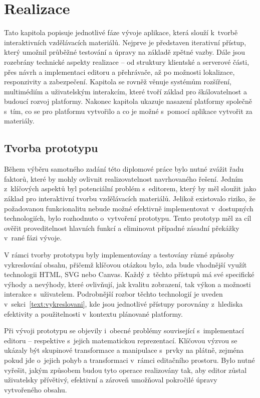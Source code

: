 \chapter{Realizace}

\begin{chapterabstract}
Tato kapitola popisuje jednotlivé fáze vývoje aplikace, která slouží k~tvorbě interaktivních vzdělávacích materiálů. 
Nejprve je představen iterativní přístup, který umožnil průběžné testování a úpravy na základě zpětné vazby. 
Dále jsou rozebrány technické aspekty realizace -- od struktury klientské a serverové části, přes návrh a implementaci editoru a přehrávače, až po možnosti lokalizace, responzivity a zabezpečení. 
Kapitola se rovněž věnuje systémům rozšíření, multimédiím a uživatelským interakcím, které tvoří základ pro škálovatelnost a budoucí rozvoj platformy. 
Nakonec kapitola ukazuje nasazení platformy společně s~tím, co se pro platformu vytvořilo a co je možné s~pomocí aplikace vytvořit za materiály.
\end{chapterabstract}

\section{Tvorba prototypu}


Během výběru samotného zadání této diplomové práce bylo nutné zvážit řadu faktorů, které by mohly ovlivnit realizovatelnost navrhovaného řešení. 
Jedním z~klíčových aspektů byl potenciální problém s~editorem, který by měl sloužit jako základ pro interaktivní tvorbu vzdělávacích materiálů. 
Jelikož existovalo riziko, že požadovanou funkcionalitu nebude možné efektivně implementovat v~dostupných technologiích, bylo rozhodnuto o~vytvoření prototypu. 
Tento prototyp měl za cíl ověřit proveditelnost hlavních funkcí a eliminovat případné zásadní překážky v~rané fázi vývoje.

V rámci tvorby prototypu byly implementovány a testovány různé způsoby vykreslování obsahu, přičemž klíčovou otázkou bylo, zda bude vhodnější využít technologii HTML, SVG nebo Canvas.
Každý z~těchto přístupů má své specifické výhody a nevýhody, které ovlivňují, jak kvalitu zobrazení, tak výkon a možnosti interakce s~uživatelem. 
Podrobnější rozbor těchto technologií je uveden v~sekci~\ref{text:vykreslovani}, kde jsou jednotlivé přístupy porovnány z~hlediska efektivity a použitelnosti v~kontextu plánované platformy.

Při vývoji prototypu se objevily i~obecné problémy související s~implementací editoru -- respektive s~jejich matematickou reprezentací. 
Klíčovou výzvou se ukázaly být skupinové transformace a manipulace s~prvky na plátně, zejména pokud jde o~jejich pohyb a transformaci v~rámci editačního prostoru.
Bylo nutné vyřešit, jakým způsobem budou tyto operace realizovány tak, aby editor zůstal uživatelsky přívětivý, efektivní a zároveň umožňoval pokročilé úpravy vytvořeného obsahu.

